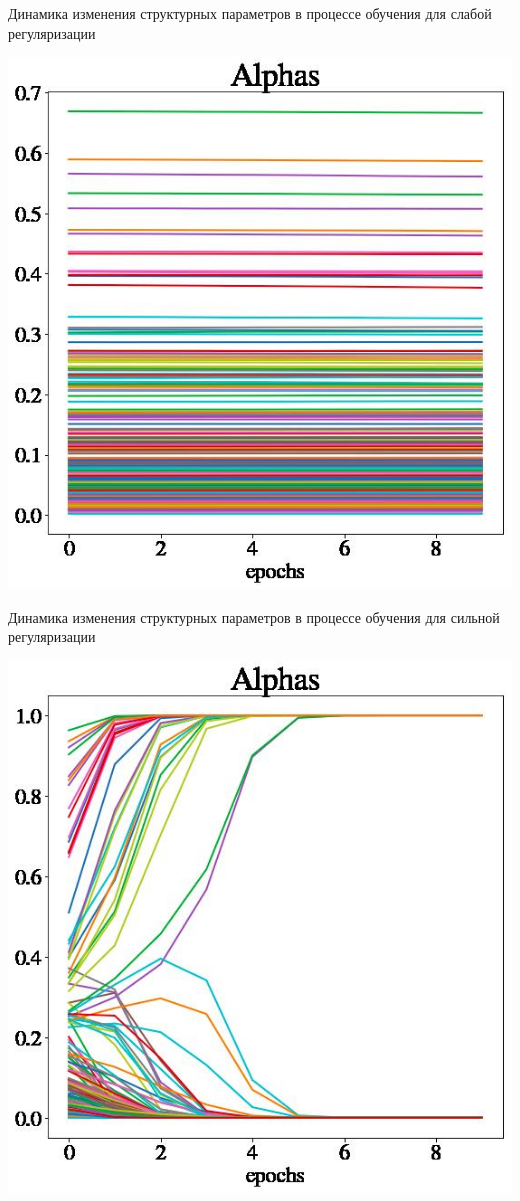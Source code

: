 \documentclass[10pt]{beamer}
\begin{document}
\begin{frame}{Динамика изменения структурных параметров в процессе обучения для слабой регуляризации}

\centering
\includegraphics[width=0.6\linewidth, hight=1\textwidth    ]{alphas_weak.jpeg}
\caption{}
\label{}


\end{frame}

\begin{frame}{Динамика изменения структурных параметров в процессе обучения для сильной регуляризации}

\centering
\includegraphics[width=0.6\linewidth]{alphas_strong.jpeg}
\caption{}
\label{}

\end{frame}
\end{document}
